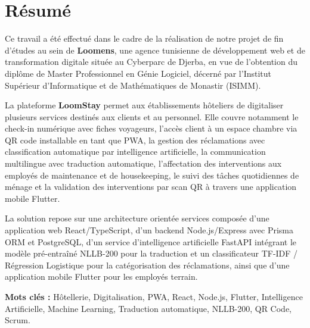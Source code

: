 \chapter*{Résumé}

Ce travail a été effectué dans le cadre de la réalisation de notre projet de fin d'études au sein de \textbf{Loomens}, une agence tunisienne de développement web et de transformation digitale située au Cyberparc de Djerba, en vue de l'obtention du diplôme de Master Professionnel en Génie Logiciel, décerné par l'Institut Supérieur d'Informatique et de Mathématiques de Monastir (ISIMM).

\medskip

La plateforme \textbf{LoomStay} permet aux établissements hôteliers de digitaliser plusieurs services destinés aux clients et au personnel. Elle couvre notamment le check-in numérique avec fiches voyageurs, l'accès client à un espace chambre via QR code installable en tant que PWA, la gestion des réclamations avec classification automatique par intelligence artificielle, la communication multilingue avec traduction automatique, l'affectation des interventions aux employés de maintenance et de housekeeping, le suivi des tâches quotidiennes de ménage et la validation des interventions par scan QR à travers une application mobile Flutter.

\medskip

La solution repose sur une architecture orientée services composée d'une application web React/TypeScript, d'un backend Node.js/Express avec Prisma ORM et PostgreSQL, d'un service d'intelligence artificielle FastAPI intégrant le modèle pré-entraîné NLLB-200 pour la traduction et un classificateur TF-IDF / Régression Logistique pour la catégorisation des réclamations, ainsi que d'une application mobile Flutter pour les employés terrain.

\medskip

\textbf{Mots clés :} Hôtellerie, Digitalisation, PWA, React, Node.js, Flutter, Intelligence Artificielle, Machine Learning, Traduction automatique, NLLB-200, QR Code, Scrum.
\newpage
